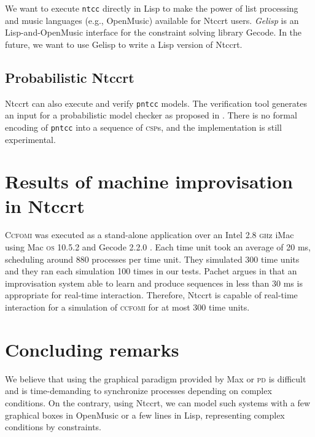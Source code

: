 \documentclass[english]{llncs}
\begin{document}
We want to execute \texttt{ntcc} directly in Lisp to make the power
of list processing and music languages (e.g., OpenMusic) available for Ntccrt users.
\textit{Gelisp} \cite{toro-report09a} is an Lisp-and-OpenMusic interface for the constraint solving library Gecode. In the future, we want to use Gelisp to write a Lisp version of Ntccrt.

\subsection{Probabilistic Ntccrt}
Ntccrt can also execute and verify \texttt{pntcc} models. The verification tool generates an input for a probabilistic model checker as proposed in \cite{perez09}. There is no formal encoding of \texttt{pntcc} into a sequence of \textsc{csp}s, and the implementation is still experimental.



\section{Results of machine improvisation in Ntccrt}


\textsc{Ccfomi} was executed as a stand-alone application over an Intel 2.8 \textsc{gh}z iMac using
Mac \textsc{os} 10.5.2 and Gecode 2.2.0 \cite{toro08}. Each time unit took an average of 20 ms, scheduling
around 880 processes per time unit. They simulated 300 time units and they ran each simulation 100 times in our tests.
Pachet argues in \cite{pachet02} that an improvisation system able to learn and produce sequences in less than 30 ms is appropriate for real-time interaction.
Therefore, Ntccrt is capable of real-time interaction for a simulation of \textsc{ccfomi} for at most 300 time units.


\section{Concluding remarks}
We believe that using the graphical paradigm provided by Max or \textsc{pd} is difficult and is time-demanding to synchronize processes depending on complex conditions. On the contrary, using Ntccrt, we can model such systems with a few graphical boxes in OpenMusic or a few lines in Lisp, representing complex conditions by constraints.



\let\oldbibliography\thebibliography
\renewcommand{\thebibliography}[1]{\oldbibliography{#1}\setlength{\itemsep}{0pt}}



{\scriptsize

}
\end{document}
